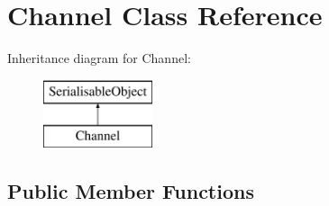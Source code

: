 \hypertarget{classChannel}{\section{Channel Class Reference}
\label{classChannel}
}
Inheritance diagram for Channel\-:\begin{figure}[H]
\begin{center}
\leavevmode
\includegraphics[height=2.000000cm]{classChannel}
\end{center}
\end{figure}
\subsection*{Public Member Functions}
